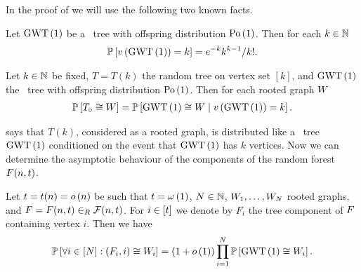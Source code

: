 In the proof of  we will use the following two known facts.
\begin{thm}\label{LSthm:total_progeny}
Let $\operatorname{GWT}\left(1\right)$ be a \GW\ tree with offspring distribution $\operatorname{Po}\left(1\right)$. Then for each $k\in\mathbb{N}$
\begin{align*}
	\mathbb{P}\left[v\left({\operatorname{GWT}\left(1\right)}\right)=k\right]=e^{-k}k^{k-1}/k!.
\end{align*}
\end{thm}

\begin{thm}\label{LSthm:cayley_gwt_tree}
Let $k\in\mathbb{N}$ be fixed, $T=T(k)$ the random tree on vertex set $[k]$, and $\operatorname{GWT}\left(1\right)$ the \GW\ tree with offspring distribution $\operatorname{Po}\left(1\right)$. Then for each rooted graph $W$
\begin{align*}
\mathbb{P}\left[T_\circ\cong W\right]=\mathbb{P}\left[\operatorname{GWT}\left(1\right)\cong W \;\middle|\; v\left({\operatorname{GWT}\left(1\right)}\right)=k\right].
\end{align*} 
\end{thm}
 says that $T(k)$, considered as a rooted graph, is distributed like a \GW\ tree $\operatorname{GWT}\left(1\right)$ conditioned on the event that $\operatorname{GWT}\left(1\right)$ has $k$ vertices. Now we can determine the asymptotic behaviour of the components of the random forest $F(n,t)$.
\begin{lem}\label{LSlem:limit_trees_forest}
Let $t=t(n)=o\left(n\right)$ be such that $t=\omega\left(1\right)$, $N\in\mathbb{N}$, $W_1, \ldots, W_N$ rooted graphs, and $F=F(n,t)\in_R\mathcal{F}(n,t)$. For $i\in[t]$ we denote by $F_i$ the tree component of $F$ containing vertex $i$. Then we have
\begin{align*}
	\mathbb{P}\left[\forall i\in[N]:\left(F_i, i\right)\cong W_i \right]=\left(1+o\left(1\right)\right)\prod_{i=1}^{N}\mathbb{P}\left[\operatorname{GWT}\left(1\right)\cong W_i\right].
\end{align*}
\end{lem}
